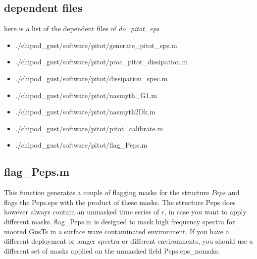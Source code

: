 \subsection{dependent files}
   here is a list of the dependent files of \textit{{do\_pitot\_eps}}
\begin{itemize}
   \item ./chipod\_gust/software/pitot/generate\_pitot\_eps.m
   \item ./chipod\_gust/software/pitot/proc\_pitot\_dissipation.m
   \item ./chipod\_gust/software/pitot/dissipation\_spec.m
   \item ./chipod\_gust/software/pitot/nasmyth\_G1.m
   \item ./chipod\_gust/software/pitot/nasmyth2Dk.m
   \item ./chipod\_gust/software/pitot/pitot\_calibrate.m
   \item ./chipod\_gust/software/pitot/flag\_Peps.m
\end{itemize}

\subsection{flag\_Peps.m}
This function generates a couple of flagging masks for the structure $Peps$ and
flags the Peps.eps with the product of these masks. 
The structure Peps does however always contain an unmasked time series of $\epsilon$,
in case you want to apply different masks. 
flag\_Peps.m is designed to mask high frequency spectra 
for moored GusTs in a surface wave contaminated environment.
If you have a different deployment or longer spectra or different environments, you
should use a different set of masks applied on the unmasked field Peps.eps\_nomaks.

